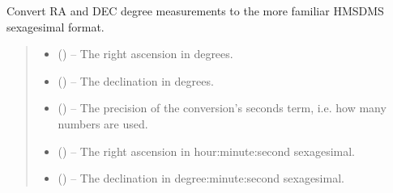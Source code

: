 \documentclass[letterpaper,11pt,english]{sphinxmanual}
\begin{document}
\begin{savenotes}\begin{fulllineitems}
\label{\detokenize{code/opihiexarata.library.conversion:opihiexarata.library.conversion.degrees_to_sexagesimal_ra_dec}}
\pysigstartsignatures
{}
\pysigstopsignatures
\sphinxAtStartPar
Convert RA and DEC degree measurements to the more familiar HMSDMS
sexagesimal format.
\begin{quote}\begin{description}
\begin{itemize}
\item {} 
\sphinxAtStartPar
{} () – The right ascension in degrees.

\item {} 
\sphinxAtStartPar
{} () – The declination in degrees.

\item {} 
\sphinxAtStartPar
{} () – The precision of the conversion’s seconds term, i.e. how many numbers
are used.

\end{itemize}

\sphinxAtStartPar
\begin{itemize}
\item {} 
\sphinxAtStartPar
{} () – The right ascension in hour:minute:second sexagesimal.

\item {} 
\sphinxAtStartPar
{} () – The declination in degree:minute:second sexagesimal.

\end{itemize}


\end{description}\end{quote}

\end{fulllineitems}\end{savenotes}
\end{document}
